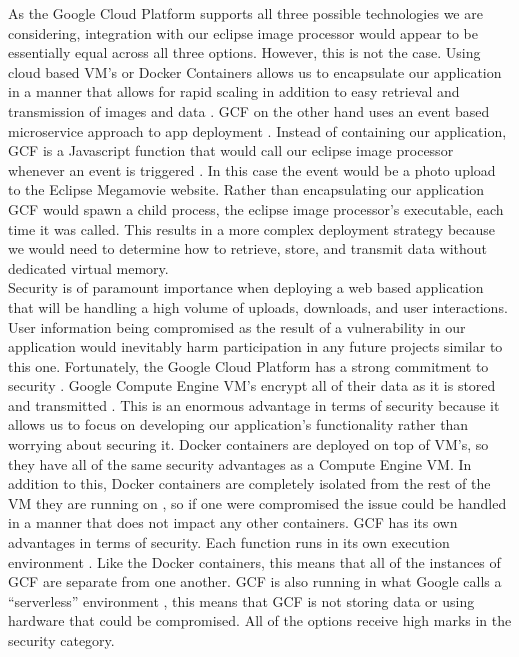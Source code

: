 \documentclass[10pt, onecolumn, draftclsnofoot, letterpaper, compsoc]{IEEEtran}
\begin{document}
As the Google Cloud Platform supports all three possible technologies we are
considering, integration with our eclipse image processor would appear to be
essentially equal across all three options. However, this is not the case. Using
cloud based VM's or Docker Containers allows us to encapsulate our application
in a manner that allows for rapid scaling in addition to easy retrieval and
transmission of images and data \cite{docker, gcp}. GCF on the other hand uses
an event based microservice approach to app deployment \cite{gcp}. Instead of
containing our application, GCF is a Javascript function that would call our
eclipse image processor whenever an event is triggered \cite{gcp}. In this case
the event would be a photo upload to the Eclipse Megamovie website. Rather than
encapsulating our application GCF would spawn a child process, the eclipse image
processor's executable, each time it was called. This results in a more complex
deployment strategy because we would need to determine how to retrieve, store,
and transmit data without dedicated virtual memory. \\

Security is of paramount importance when deploying a web based application that
will be handling a high volume of uploads, downloads, and user interactions.
User information being compromised as the result of a vulnerability in our
application would inevitably harm participation in any future projects similar
to this one. Fortunately, the Google Cloud Platform has a strong commitment to
security \cite{gcp}. Google Compute Engine VM's encrypt all of their data as it
is stored and transmitted \cite{gcp}. This is an enormous advantage in terms of
security because it allows us to focus on developing our application's
functionality rather than worrying about securing it. Docker containers are
deployed on top of VM's, so they have all of the same security advantages as a
Compute Engine VM. In addition to this, Docker containers are completely
isolated from the rest of the VM they are running on \cite{docker}, so if one
were compromised the issue could be handled in a manner that does not impact any
other containers. GCF has its own advantages in terms of security. Each function
runs in its own execution environment \cite{docker}. Like the Docker containers,
this means that all of the instances of GCF are separate from one another. GCF
is also running in what Google calls a ``serverless” environment \cite{docker},
this means that GCF is not storing data or using hardware that could be
compromised. All of the options receive high marks in the security category. \\
\end{document}
